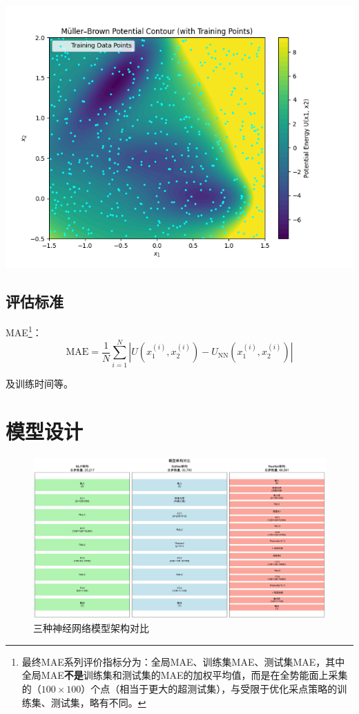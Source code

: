 \documentclass[11pt]{article}
\begin{document}
\begin{minipage}[t]{0.48\textwidth}
    \vspace{-\baselineskip}
    \centering
    \includegraphics[width=\linewidth]{potential_data.png}
    \label{fig:surface}
\end{minipage}
\subsection{评估标准}
MAE\footnote{最终MAE系列评价指标分为：全局MAE、训练集MAE、测试集MAE，其中全局MAE\textbf{不是}训练集和测试集的MAE的加权平均值，而是在全势能面上采集的（$100\times100$）个点（相当于更大的超测试集），与受限于优化采点策略的训练集、测试集，略有不同。}：
\[
    \text{MAE} = \frac{1}{N} \sum_{i=1}^N |U(x_1^{(i)}, x_2^{(i)}) - U_{\text{NN}}(x_1^{(i)}, x_2^{(i)})|
\]


及训练时间等。

\section{模型设计}

\begin{figure}[H]
    \centering
    \includegraphics[width=0.9\linewidth]{results_20250330_150206/figures/模型架构对比.png}
    \caption{三种神经网络模型架构对比}
    \label{fig:model_comparison}
\end{figure}
\end{document}
